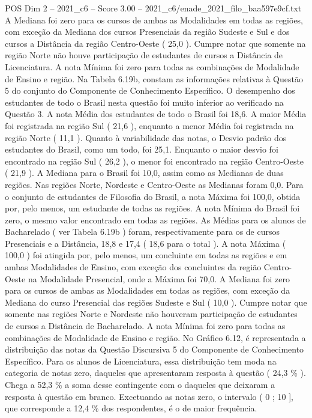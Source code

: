 \begin{textsample}{POS Dim 2 – 2021\_c6 – Score 3.00 – 2021\_c6/enade\_2021\_filo\_baa597e9cf.txt}
A Mediana foi zero para os cursos de ambas as Modalidades em todas as regiões, com exceção da Mediana dos cursos Presenciais da região Sudeste e Sul e dos cursos a Distância da região Centro-Oeste ( 25,0 ).
Cumpre notar que somente na região Norte não houve participação de estudantes de cursos a Distância de Licenciatura.
A nota Mínima foi zero para todas as combinações de Modalidade de Ensino e região.
Na Tabela 6.19b, constam as informações relativas à Questão 5 do conjunto do Componente de Conhecimento Específico.
O desempenho dos estudantes de todo o Brasil nesta questão foi muito inferior ao verificado na Questão 3.
A nota Média dos estudantes de todo o Brasil foi 18,6.
A maior Média foi registrada na região Sul ( 21,6 ), enquanto a menor Média foi registrada na região Norte ( 11,1 ).
Quanto à variabilidade das notas, o Desvio padrão dos estudantes do Brasil, como um todo, foi 25,1.
Enquanto o maior desvio foi encontrado na região Sul ( 26,2 ), o menor foi encontrado na região Centro-Oeste ( 21,9 ).
A Mediana para o Brasil foi 10,0, assim como as Medianas de duas regiões.
Nas regiões Norte, Nordeste e Centro-Oeste as Medianas foram 0,0.
Para o conjunto de estudantes de Filosofia do Brasil, a nota Máxima foi 100,0, obtida por, pelo menos, um estudante de todas as regiões.
A nota Mínima do Brasil foi zero, o mesmo valor encontrado em todas as regiões.
As Médias para os alunos de Bacharelado ( ver Tabela 6.19b ) foram, respectivamente para os de cursos Presenciais e a Distância, 18,8 e 17,4 ( 18,6 para o total ).
A nota Máxima ( 100,0 ) foi atingida por, pelo menos, um concluinte em todas as regiões e em ambas Modalidades de Ensino, com exceção dos concluintes da região Centro-Oeste na Modalidade Presencial, onde a Máxima foi 70,0.
A Mediana foi zero para os cursos de ambas as Modalidades em todas as regiões, com exceção da Mediana do curso Presencial das regiões Sudeste e Sul ( 10,0 ).
Cumpre notar que somente nas regiões Norte e Nordeste não houveram participação de estudantes de cursos a Distância de Bacharelado.
A nota Mínima foi zero para todas as combinações de Modalidade de Ensino e região.
No Gráfico 6.12, é representada a distribuição das notas da Questão Discursiva 5 do Componente de Conhecimento Específico.
Para os alunos de Licenciatura, essa distribuição tem moda na categoria de notas zero, daqueles que apresentaram resposta à questão ( 24,3 \% ).
Chega a 52,3 \% a soma desse contingente com o daqueles que deixaram a resposta à questão em branco.
Excetuando as notas zero, o intervalo ( 0 ; 10 ], que corresponde a 12,4 \% dos respondentes, é o de maior frequência.

\end{textsample}
